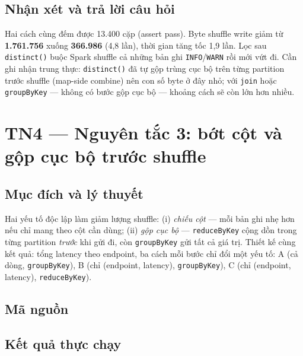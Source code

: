 \documentclass[12pt,a4paper,oneside]{article}
\begin{document}


\subsection{Nhận xét và trả lời câu hỏi}

Hai cách cùng đếm được 13.400 cặp (assert pass). Byte shuffle write giảm từ \textbf{1.761.756} xuống \textbf{366.986} (4,8 lần), thời gian tăng tốc 1,9 lần. Lọc sau \texttt{distinct()} buộc Spark shuffle cả những bản ghi \texttt{INFO}/\texttt{WARN} rồi mới vứt đi. Cần ghi nhận trung thực: \texttt{distinct()} đã tự gộp trùng cục bộ trên từng partition trước shuffle (map-side combine) nên con số byte ở đây nhỏ; với \texttt{join} hoặc \texttt{groupByKey} --- không có bước gộp cục bộ --- khoảng cách sẽ còn lớn hơn nhiều.

\section{TN4 --- Nguyên tắc 3: bớt cột và gộp cục bộ trước shuffle}
\label{sec:tn4}

\subsection{Mục đích và lý thuyết}

Hai yếu tố độc lập làm giảm lượng shuffle: (i) \emph{chiếu cột} --- mỗi bản ghi nhẹ hơn nếu chỉ mang theo cột cần dùng; (ii) \emph{gộp cục bộ} --- \texttt{reduceByKey} cộng dồn trong từng partition \emph{trước} khi gửi đi, còn \texttt{groupByKey} gửi tất cả giá trị. Thiết kế cùng kết quả: tổng latency theo endpoint, ba cách mỗi bước chỉ đổi một yếu tố: A (cả dòng, \texttt{groupByKey}), B (chỉ (endpoint, latency), \texttt{groupByKey}), C (chỉ (endpoint, latency), \texttt{reduceByKey}).

\subsection{Mã nguồn}



\subsection{Kết quả thực chạy}
\end{document}
